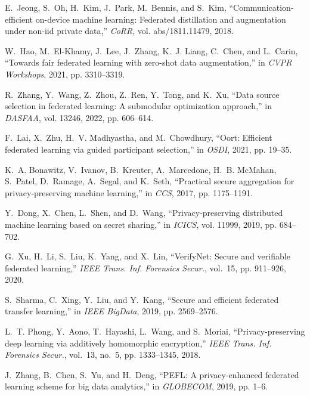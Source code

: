\documentclass[11pt]{article}
\begin{document}
\begin{thebibliography}{10}
E.~Jeong, S.~Oh, H.~Kim, J.~Park, M.~Bennis, and S.~Kim,
  ``Communication-efficient on-device machine learning: Federated distillation
  and augmentation under non-iid private data,'' \emph{CoRR}, vol.
  abs/1811.11479, 2018.

W.~Hao, M.~El{-}Khamy, J.~Lee, J.~Zhang, K.~J. Liang, C.~Chen, and L.~Carin,
  ``Towards fair federated learning with zero-shot data augmentation,'' in
  \emph{{CVPR} Workshops}, 2021, pp. 3310--3319.

R.~Zhang, Y.~Wang, Z.~Zhou, Z.~Ren, Y.~Tong, and K.~Xu, ``Data source selection
  in federated learning: {A} submodular optimization approach,'' in
  \emph{{DASFAA}}, vol. 13246, 2022, pp. 606--614.

F.~Lai, X.~Zhu, H.~V. Madhyastha, and M.~Chowdhury, ``Oort: Efficient federated
  learning via guided participant selection,'' in \emph{{OSDI}}, 2021, pp.
  19--35.

K.~A. Bonawitz, V.~Ivanov, B.~Kreuter, A.~Marcedone, H.~B. McMahan, S.~Patel,
  D.~Ramage, A.~Segal, and K.~Seth, ``Practical secure aggregation for
  privacy-preserving machine learning,'' in \emph{{CCS}}, 2017, pp. 1175--1191.

Y.~Dong, X.~Chen, L.~Shen, and D.~Wang, ``Privacy-preserving distributed
  machine learning based on secret sharing,'' in \emph{{ICICS}}, vol. 11999,
  2019, pp. 684--702.

G.~Xu, H.~Li, S.~Liu, K.~Yang, and X.~Lin, ``{VerifyNet}: Secure and verifiable
  federated learning,'' \emph{{IEEE} Trans. Inf. Forensics Secur.}, vol.~15,
  pp. 911--926, 2020.

S.~Sharma, C.~Xing, Y.~Liu, and Y.~Kang, ``Secure and efficient federated
  transfer learning,'' in \emph{{IEEE} BigData}, 2019, pp. 2569--2576.

L.~T. Phong, Y.~Aono, T.~Hayashi, L.~Wang, and S.~Moriai, ``Privacy-preserving
  deep learning via additively homomorphic encryption,'' \emph{{IEEE} Trans.
  Inf. Forensics Secur.}, vol.~13, no.~5, pp. 1333--1345, 2018.

J.~Zhang, B.~Chen, S.~Yu, and H.~Deng, ``{PEFL:} {A} privacy-enhanced federated
  learning scheme for big data analytics,'' in \emph{{GLOBECOM}}, 2019, pp.
  1--6.


\end{thebibliography}
\end{document}
